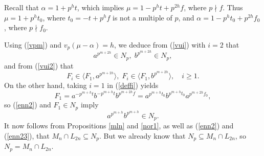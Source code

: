 \documentclass{amsart}
\theoremstyle{definition}
\theoremstyle{remark}
\begin{document}
Recall that $\alpha=1+p^h t$, which implies $\mu=1-p^h t+p^{2h} f$, where $p\nmid f$. Thus $\mu=1+p^h t_0$,
where $t_0=-t+p^h f$ is not a multiple of $p$, and  $\alpha=1-p^h t_0+p^{2h}f_0$, where $p\nmid f_0$. 

Using (\ref{vpm}) and $v_p(\mu-\alpha)=h$,
we deduce from (\ref{vui}) with $i=2$ that
\begin{equation}
\label{enn2}
a^{p^{m+2h}}\in N_p,\; b^{p^{m+2h}}\in N_p,
\end{equation}
and from (\ref{vui2}) that
\begin{equation}
\label{enn22}
F_i\in \langle F_1, a^{p^{m+2h}}\rangle,\; F_i\in \langle F_1, b^{p^{m+2h}}\rangle,\quad i\geq 1.
\end{equation}
On the other hand, taking $i=1$ in (\ref{deffi}) yields
$$
F_1=a^{-p^{m+h}t} b^{-p^{m+h}t}b^{p^{m+2h}f}=a^{p^{m+h}t_0} b^{p^{m+h}t_0}a^{p^{m+2h}f_0},
$$
so (\ref{enn2}) and $F_1\in N_p$ imply
\begin{equation}
\label{enn23}
a^{p^{m+h}} b^{p^{m+h}}\in N_p.
\end{equation}
It now follows from Propositions \ref{mln} and \ref{nor1}, as well as (\ref{enn2}) and (\ref{enn23}), that 
$M_n\cap L_{2n}\subseteq N_p$. But we already know that $N_p \subseteq M_n\cap L_{2n}$, so $N_p=M_n\cap L_{2n}$.
\end{document}
